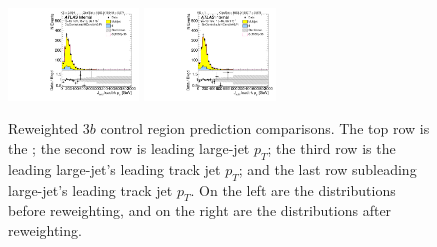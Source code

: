 \begin{figure}[htbp!]
\begin{center}
\includegraphics[width=0.31\textwidth,angle=-90]{figures/boosted/Prereweight/Moriond_ThreeTag_Control_sublHCand_trk0_Pt.pdf}
\includegraphics[width=0.31\textwidth,angle=-90]{figures/boosted/Control/b77_ThreeTag_Control_sublHCand_trk0_Pt.pdf}\\
\caption{Reweighted $3b$ control region prediction comparisons. The top row is the \mtwoJ; the second row is leading large-\R jet $p_{T}$; the third row is the leading large-\R jet's leading track jet $p_T$; and the last row subleading large-\R jet's leading track jet $p_T$. On the left are the distributions before reweighting, and on the right are the distributions after reweighting.}
\label{fig:rw-3b-comp-cr}
\end{center}
\end{figure}


